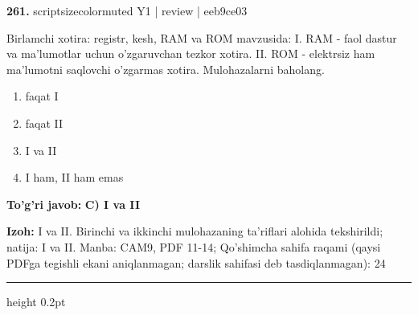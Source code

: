 \documentclass[10pt,a4paper]{article}
\begin{document}
{\bfseries\sffamily\color{ink} 261.} {scriptsizecolor{muted} Y1 | review | eeb9ce03}
\par
Birlamchi xotira: registr, kesh, RAM va ROM mavzusida: I. RAM - faol dastur va ma'lumotlar uchun o'zgaruvchan tezkor xotira. II. ROM - elektrsiz ham ma'lumotni saqlovchi o'zgarmas xotira. Mulohazalarni baholang.
\begin{enumerate}[label=\Alph*),leftmargin=9mm]
\item faqat I
\item faqat II
\item I va II
\item I ham, II ham emas
\end{enumerate}
\begin{tcolorbox}[enhanced,breakable,colback=teal!4,colframe=teal!60!black,boxrule=0.45pt,arc=1.2mm,left=2.7mm,right=2.7mm,top=1.8mm,bottom=1.8mm,before skip=2mm,after skip=2mm]
{\bfseries\sffamily\color{teal}To'g'ri javob:} \textbf{C) I va II}
\par\smallskip
{\bfseries Izoh:} I va II. Birinchi va ikkinchi mulohazaning ta'riflari alohida tekshirildi; natija: I va II. Manba: CAM9, PDF 11-14; Qo'shimcha sahifa raqami (qaysi PDFga tegishli ekani aniqlanmagan; darslik sahifasi deb tasdiqlanmagan): 24
\end{tcolorbox}
\vspace{2mm}\hrule height 0.2pt\vspace{3mm}
\end{document}
